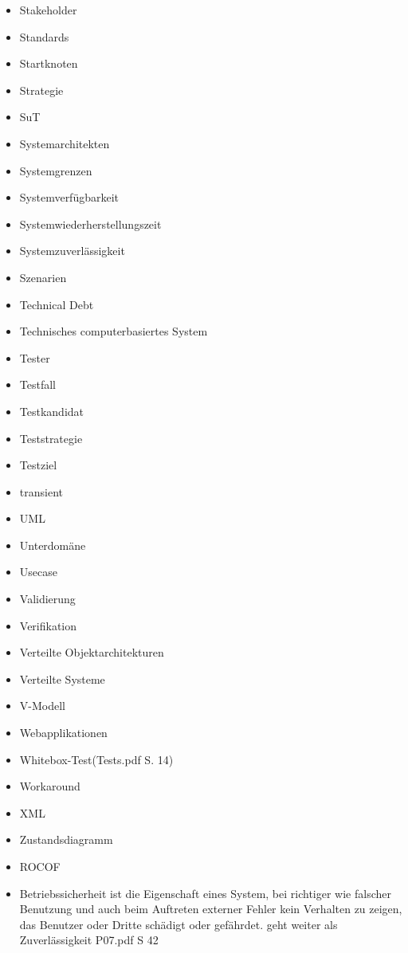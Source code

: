 \begin{itemize}
\item 	Stakeholder
\item 	Standards
\item 	Startknoten
\item 	Strategie
\item 	SuT
\item 	Systemarchitekten
\item 	Systemgrenzen
\item 	Systemverfügbarkeit
\item 	Systemwiederherstellungszeit
\item 	Systemzuverlässigkeit
\item 	Szenarien
\item 	Technical Debt
\item 	Technisches computerbasiertes System
\item 	Tester
\item 	Testfall
\item 	Testkandidat
\item 	Teststrategie
\item 	Testziel
\item 	transient
\item 	UML
\item 	Unterdomäne
\item 	Usecase
\item 	Validierung
\item 	Verifikation
\item 	Verteilte Objektarchitekturen
\item 	Verteilte Systeme
\item 	V-Modell
\item 	Webapplikationen
\item 	Whitebox-Test(Tests.pdf S. 14)
\item 	Workaround
\item 	XML
\item 	Zustandsdiagramm
\item 	ROCOF
\item 	Betriebssicherheit ist die Eigenschaft eines System, bei richtiger wie falscher Benutzung und auch beim Auftreten externer Fehler kein Verhalten zu zeigen, das Benutzer oder Dritte schädigt oder  gefährdet. geht weiter als Zuverlässigkeit P07.pdf S 42
\end{itemize}